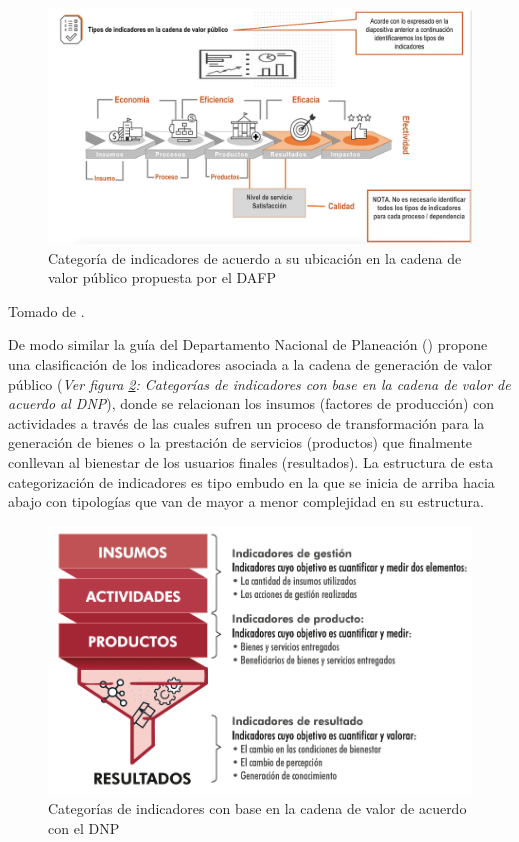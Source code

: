 \documentclass[
]{book}
\begin{document}
\begin{figure}

{\centering \includegraphics[width=0.85\linewidth]{Imagenes/figura_5} 

}

\caption{Categoría de indicadores de acuerdo a su ubicación en la cadena de valor público propuesta por el DAFP}\label{fig:figura5}
\end{figure}

Tomado de \citet{publica2015guia}.

De modo similar la guía del Departamento Nacional de Planeación (\citet{sanchez2018guia}) propone una clasificación de los indicadores asociada a la cadena de generación de valor público (\emph{Ver figura \ref{fig:figura6}: Categorías de indicadores con base en la cadena de valor de acuerdo al DNP}), donde se relacionan los insumos (factores de producción) con actividades a través de las cuales sufren un proceso de transformación para la generación de bienes o la prestación de servicios (productos) que finalmente conllevan al bienestar de los usuarios finales (resultados). La estructura de esta categorización de indicadores es tipo embudo en la que se inicia de arriba hacia abajo con tipologías que van de mayor a menor complejidad en su estructura.

\begin{figure}

{\centering \includegraphics[width=0.7\linewidth]{Imagenes/figura_6} 

}

\caption{Categorías de indicadores con base en la cadena de valor de acuerdo con el DNP}\label{fig:figura6}
\end{figure}
\end{document}
